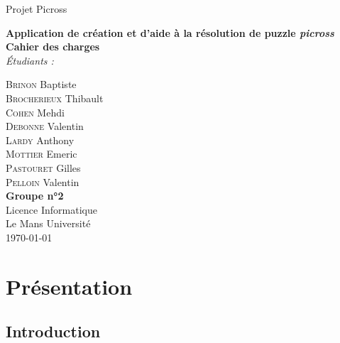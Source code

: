 \documentclass{report}
\begin{document}
\begin{titlepage}
	\begin{center}
	
		\begin{spacing}{1.5}
			Projet Picross\\
			\vspace*{\fill}
		\end{spacing}
		
		\begin{spacing}{2.5}
			\textbf{\Huge Application de création et d'aide à la résolution de puzzle \textit{picross}}\\[0.5cm]
			\textbf{\huge Cahier des charges} \\
			\vspace*{\fill}
			\textit{Étudiants :}
		\end{spacing}

		\begin{spacing}{1.15}
			\large
			\textsc{Brinon} Baptiste\\
			\textsc{Brocherieux} Thibault\\
			\textsc{Cohen} Mehdi\\
			\textsc{Debonne} Valentin\\
			\textsc{Lardy} Anthony\\
			\textsc{Mottier} Emeric\\
			\textsc{Pastouret} Gilles\\
			\textsc{Pelloin} Valentin\\
			\vspace*{\fill}
			\textbf{Groupe n°2} \\
			\textnormal{\large Licence Informatique\\ Le Mans Université\\ \today}
		\end{spacing}
		
	\end{center}
\end{titlepage}


\renewcommand{\contentsname}{Sommaire}
\tableofcontents


\chapter{Présentation}

	\section{Introduction}
\end{document}
